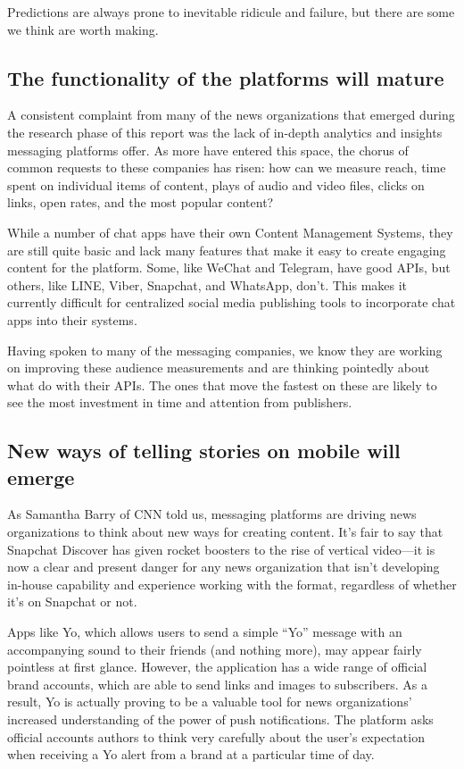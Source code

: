 \documentclass[notoc, symmetric, nobib, nols]{towcenter-guideto-book}
\begin{document}
Predictions are always prone to inevitable ridicule and failure, but there are some we think are worth making.

\subsection{The functionality of the platforms will mature}
A consistent complaint from many of the news organizations that emerged during the research phase of this report was the lack of in-depth analytics and insights messaging platforms offer. As more have entered this space, the chorus of common requests to these companies has risen: how can we measure reach, time spent on individual items of content, plays of audio and video files, clicks on links, open rates, and the most popular content?

While a number of chat apps have their own Content Management Systems, they are still quite basic and lack many features that make it easy to create engaging content for the platform. Some, like WeChat and Telegram, have good APIs, but others, like LINE, Viber, Snapchat, and WhatsApp, don't. This makes it currently difficult for centralized social media publishing tools to incorporate chat apps into their systems.

Having spoken to many of the messaging companies, we know they are working on improving these audience measurements and are thinking pointedly about what do with their APIs. The ones that move the fastest on these are likely to see the most investment in time and attention from publishers. 

\subsection{New ways of telling stories on mobile will emerge}
As Samantha Barry of CNN told us, messaging platforms are driving news organizations to think about new ways for creating content. It's fair to say that Snapchat Discover has given rocket boosters to the rise of vertical video---it is now a clear and present danger for any news organization that isn't developing in-house capability and experience working with the format, regardless of whether it's on Snapchat or not. 

Apps like Yo, which allows users to send a simple ``Yo'' message with an accompanying sound to their friends (and nothing more), may appear fairly pointless at first glance. However, the application has a wide range of official brand accounts, which are able to send links and images to subscribers. As a result, Yo is actually proving to be a valuable tool for news organizations' increased understanding of the power of push notifications. The platform asks official accounts authors to think very carefully about the user's expectation when receiving a Yo alert from a brand at a particular time of day.
\end{document}
